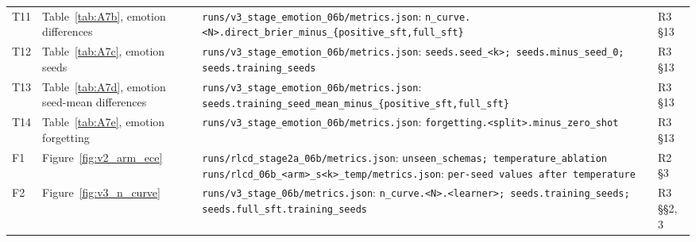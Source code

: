 \documentclass[10pt,letterpaper]{article}
\theoremstyle{plain}
\begin{document}
{\begin{longtable}{@{}p{}>{\raggedright\arraybackslash}p{}>{\raggedright\arraybackslash}p{}>{\raggedright\arraybackslash}p{}@{}}
T11 & Table~\ref{tab:A7b}, emotion differences & \texttt{runs/\allowbreak{}v3\_\allowbreak{}stage\_\allowbreak{}emotion\_\allowbreak{}06b/\allowbreak{}metrics.\allowbreak{}json}: \texttt{n\_\allowbreak{}curve.\allowbreak{}\textless{}N\textgreater{}.\allowbreak{}direct\_\allowbreak{}brier\_\allowbreak{}minus\_\allowbreak{}\{positive\_\allowbreak{}sft,full\_\allowbreak{}sft\}} & R3 \S13 \\
T12 & Table~\ref{tab:A7c}, emotion seeds & \texttt{runs/\allowbreak{}v3\_\allowbreak{}stage\_\allowbreak{}emotion\_\allowbreak{}06b/\allowbreak{}metrics.\allowbreak{}json}: \texttt{seeds.\allowbreak{}seed\_\allowbreak{}\textless{}k\textgreater{};\allowbreak{} seeds.\allowbreak{}minus\_\allowbreak{}seed\_\allowbreak{}0;\allowbreak{} seeds.\allowbreak{}training\_\allowbreak{}seeds} & R3 \S13 \\
T13 & Table~\ref{tab:A7d}, emotion seed-mean differences & \texttt{runs/\allowbreak{}v3\_\allowbreak{}stage\_\allowbreak{}emotion\_\allowbreak{}06b/\allowbreak{}metrics.\allowbreak{}json}: \texttt{seeds.\allowbreak{}training\_\allowbreak{}seed\_\allowbreak{}mean\_\allowbreak{}minus\_\allowbreak{}\{positive\_\allowbreak{}sft,full\_\allowbreak{}sft\}} & R3 \S13 \\
T14 & Table~\ref{tab:A7e}, emotion forgetting & \texttt{runs/\allowbreak{}v3\_\allowbreak{}stage\_\allowbreak{}emotion\_\allowbreak{}06b/\allowbreak{}metrics.\allowbreak{}json}: \texttt{forgetting.\allowbreak{}\textless{}split\textgreater{}.\allowbreak{}minus\_\allowbreak{}zero\_\allowbreak{}shot} & R3 \S13 \\
F1 & Figure~\ref{fig:v2_arm_ece} & \texttt{runs/\allowbreak{}rlcd\_\allowbreak{}stage2a\_\allowbreak{}06b/\allowbreak{}metrics.\allowbreak{}json}: \texttt{unseen\_\allowbreak{}schemas;\allowbreak{} temperature\_\allowbreak{}ablation} \newline \texttt{runs/\allowbreak{}rlcd\_\allowbreak{}06b\_\allowbreak{}\textless{}arm\textgreater{}\_\allowbreak{}s\textless{}k\textgreater{}\_\allowbreak{}temp/\allowbreak{}metrics.\allowbreak{}json}: \texttt{per-seed values after temperature} & R2 \S3 \\
F2 & Figure~\ref{fig:v3_n_curve} & \texttt{runs/\allowbreak{}v3\_\allowbreak{}stage\_\allowbreak{}06b/\allowbreak{}metrics.\allowbreak{}json}: \texttt{n\_\allowbreak{}curve.\allowbreak{}\textless{}N\textgreater{}.\allowbreak{}\textless{}learner\textgreater{};\allowbreak{} seeds.\allowbreak{}training\_\allowbreak{}seeds;\allowbreak{} seeds.\allowbreak{}full\_\allowbreak{}sft.\allowbreak{}training\_\allowbreak{}seeds} & R3 \S\S2, 3 \\

\end{longtable}}
\end{document}
